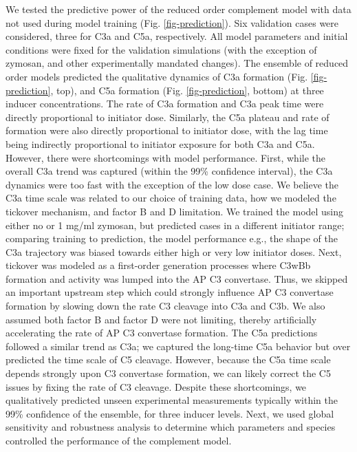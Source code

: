 \documentclass[12pt]{article}
\begin{document}
We tested the predictive power of the reduced order complement model with data not used during model training (Fig. \ref{fig-prediction}).
Six validation cases were considered, three for C3a and C5a, respectively.
All model parameters and initial conditions were fixed for the validation simulations (with the exception of zymosan, and other experimentally mandated changes).
The ensemble of reduced order models predicted the qualitative dynamics of C3a formation (Fig. \ref{fig-prediction}, top),
and C5a formation (Fig. \ref{fig-prediction}, bottom) at three inducer concentrations.
The rate of C3a formation and C3a peak time were directly proportional to initiator dose.
Similarly, the C5a plateau and rate of formation were also directly proportional to initiator dose, with the lag time being indirectly proportional to initiator exposure for both C3a and C5a. However, there were shortcomings with model performance.
First, while the overall C3a trend was captured (within the 99\% confidence interval), the C3a dynamics were too fast with the exception of the low dose case.
We believe the C3a time scale was related to our choice of training data, how we modeled the tickover mechanism, and factor B and D limitation.
We trained the model using either no or 1 mg/ml zymosan, but predicted cases in a different initiator range;
comparing training to prediction, the model performance e.g., the shape of the C3a trajectory was biased towards either high or very low initiator doses.
Next, tickover was modeled as a first-order generation processes where C3wBb formation and activity was lumped into the AP C3 convertase.
Thus, we skipped an important upstream step which could strongly influence AP C3 convertase formation by slowing down the rate C3 cleavage into C3a and C3b.
We also assumed both factor B and factor D were not limiting, thereby artificially accelerating the rate of AP C3 convertase formation.
The C5a predictions followed a similar trend as C3a; we captured the long-time C5a behavior but over predicted the time scale of C5 cleavage.
However, because the C5a time scale depends strongly upon C3 convertase formation, we can likely correct the C5 issues by fixing the rate of C3 cleavage.
Despite these shortcomings, we qualitatively predicted unseen experimental measurements typically within the 99\% confidence of the ensemble, for three inducer levels.
Next, we used global sensitivity and robustness analysis to determine which parameters and species controlled the performance of the complement model.

%
\end{document}

